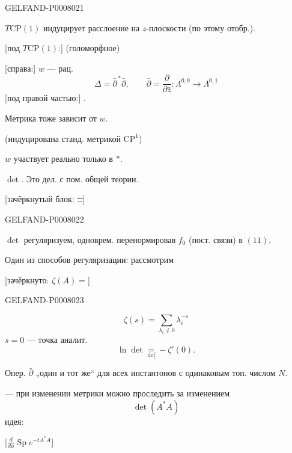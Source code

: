 \begin{GelfandAdjacentEvidence}{GELFAND-P000802}{1}

\(T\mathrm{CP}(1)\) индуцирует расслоение на \(z\)-плоскости (по этому отобр.).

[под \(T\mathrm{CP}(1)\):] (голоморфное)

[справа:] \(w\) --- рац.
\begin{equation*}
\Delta=\bar\partial^{\,*}\bar\partial,\qquad
\bar\partial=\frac{\partial}{\partial\bar z}:\Lambda^{0,0}\to\Lambda^{0,1}
\tag{15}
\end{equation*}
[под правой частью:] .

Метрика тоже зависит от \(w\).

(индуцирована станд. метрикой \(\mathrm{CP}^{1}\))

\(w\) участвует реально только в \(*\).

 \(\det\). Это дел. с пом. общей теории.

[зачёркнутый блок: \sout{\ldots}]
\end{GelfandAdjacentEvidence}
\begin{GelfandAdjacentEvidence}{GELFAND-P000802}{2}


\(\det\) регуляризуем, одноврем. перенормировав \(f_0\) (пост. связи) в \((11)\).

Один из способов регуляризации: рассмотрим

[зачёркнуто: \sout{\(\zeta(A)=\)}]
\end{GelfandAdjacentEvidence}
\begin{GelfandAdjacentEvidence}{GELFAND-P000802}{3}

\begin{equation*}
\zeta(s)=\sum_{\lambda_i\ne0}\lambda_i^{-s}
\tag{16}
\end{equation*}
\(s=0\) --- точка аналит.
\begin{equation*}
\underline{\ln\det\underset{\mathrm{def}}{=}-\zeta'(0)}.
\tag{17}
\end{equation*}

Опер. \(\bar\partial\) „один и тот же“ для всех инстантонов с одинаковым топ. числом \(N\).

 --- при изменении метрики можно проследить за изменением
\[
\det(A^*A)
\]
идея:

[\sout{\(\frac{d}{du}\operatorname{Sp}e^{-tA^*A}\)}]
\end{GelfandAdjacentEvidence}
